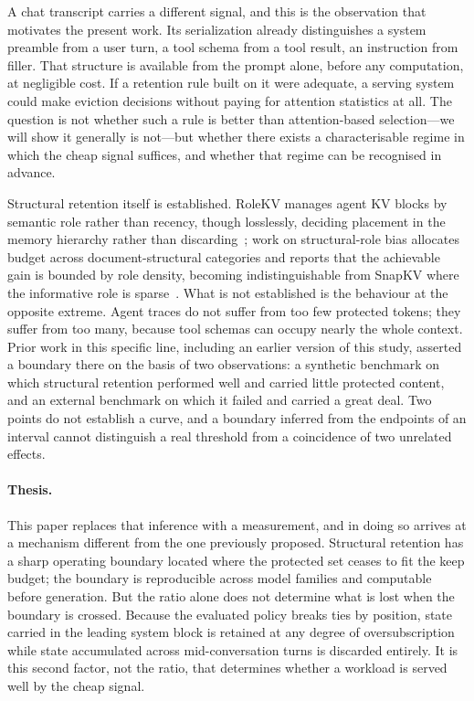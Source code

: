 A chat transcript carries a different signal, and this is the observation that
motivates the present work.  Its serialization already distinguishes a system
preamble from a user turn, a tool schema from a tool result, an instruction from
filler.  That structure is available from the prompt alone, before any
computation, at negligible cost.  If a retention rule built on it were adequate,
a serving system could make eviction decisions without paying for attention
statistics at all.  The question is not whether such a rule is better than
attention-based selection---we will show it generally is not---but whether there
exists a characterisable regime in which the cheap signal suffices, and whether
that regime can be recognised in advance.

Structural retention itself is established.  RoleKV manages agent KV blocks by
semantic role rather than recency, though losslessly, deciding placement in the
memory hierarchy rather than discarding~\cite{rolekv}; work on structural-role
bias allocates budget across document-structural categories and reports that the
achievable gain is bounded by role density, becoming indistinguishable from
SnapKV where the informative role is sparse~\cite{structrolebias}.  What is not
established is the behaviour at the opposite extreme.  Agent traces do not
suffer from too few protected tokens; they suffer from too many, because tool
schemas can occupy nearly the whole context.  Prior work in this specific line,
including an earlier version of this study, asserted a boundary there on the
basis of two observations: a synthetic benchmark on which structural retention
performed well and carried little protected content, and an external benchmark
on which it failed and carried a great deal.  Two points do not establish a
curve, and a boundary inferred from the endpoints of an interval cannot
distinguish a real threshold from a coincidence of two unrelated effects.

\paragraph{Thesis.}  This paper replaces that inference with a measurement, and
in doing so arrives at a mechanism different from the one previously proposed.
Structural retention has a sharp operating boundary located where the protected
set ceases to fit the keep budget; the boundary is reproducible across model
families and computable before generation.  But the ratio alone does not
determine what is lost when the boundary is crossed.  Because the evaluated
policy breaks ties by position, state carried in the leading system block is
retained at any degree of oversubscription while state accumulated across
mid-conversation turns is discarded entirely.  It is this second factor, not the
ratio, that determines whether a workload is served well by the cheap signal.

